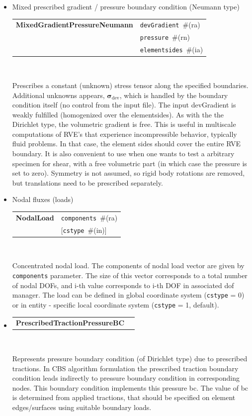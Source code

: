 \documentclass[a4paper]{article}
\makeatletter
\newcommand{\tens}[1]{\boldsymbol{#1}} %
\newcommand{\dev}{\mathrm{dev}}
\newcommand{\param}[1]{\texttt{#1}} %
\newcommand{\optional}[1]{[#1]} %
\newcommand{\field}[2]{\param{#1}~\#{\tiny(#2)}} %
\newcommand{\optField}[2]{\optional{\field{#1}{#2}}}
\newcommand{\entKeywordInst}[1]{\textbf{#1}} %
\newenvironment{record}[1][]{\begin{tabular}{|ll}}{\end{tabular}\\}
\newcommand{\recentry}[2]{{#1}&{#2}\\}
\newcounter{rcc}
\newenvironment{record}[1][\textwidth]{\setcounter{rcc}{0}\begin{tabular*}{#1}{|ll@{\extracolsep{\fill}}r}}{\end{tabular*}\\}
\newcommand{\recentry}[2]{\ifthenelse{\value{rcc}>0}{&$\backslash$ \\}{\setcounter{rcc}{1}}{#1}&{#2}}
\makeatother
\begin{document}
\begin{itemize}
\item Mixed prescribed gradient / pressure boundary condition (Neumann type)

\begin{record}[0.9\textwidth]
  \recentry{\entKeywordInst{MixedGradientPressureNeumann}}{\field{devGradient}{ra}}
  \recentry{}{\field{pressure}{rn}}
  \recentry{}{\field{elementsides}{ia}}
\end{record}

Prescribes a constant (unknown) stress tensor along the specified boundaries.
Additional unknowns appears, $\tens{\sigma}_\dev$, which is handled by the boundary condition itself (no control from the input file).
The input devGradient is weakly fulfilled (homogenized over the elementsides). As with the the Dirichlet type, the volumetric gradient is free.
This is useful in multiscale computations of RVE's that experience incompressible behavior, typically fluid problems. In that case, the element sides should cover the entire RVE boundary.
It is also convenient to use when one wants to test a arbitrary specimen for shear, with a free volumetric part (in which case the pressure is set to zero).
Symmetry is not assumed, so rigid body rotations are removed, but translations need to be prescribed separately.

\item Nodal fluxes (loads)

\noindent
\begin{record}[0.9\textwidth]
  \recentry{\entKeywordInst{NodalLoad}}{\field{components}{ra}} \recentry{}{\optField{cstype}{in}}
\end{record}

Concentrated nodal load. The components of nodal load vector
are given by \param{components} parameter. The size of this vector
corresponds to a total number of nodal DOFs, and i-th value
corresponds to i-th DOF in associated dof manager. The load can be defined in global coordinate system (\param{cstype} =
0) or in entity - specific local coordinate system
(\param{cstype} = 1, default).
\item \mbox{}

\noindent
\begin{record}[0.9\textwidth]
  \recentry{\entKeywordInst{PrescribedTractionPressureBC}}{}
\end{record}

Represents pressure boundary condition (of Dirichlet type) due to
prescribed tractions.
In CBS algorithm formulation the prescribed traction
boundary condition leads indirectly to pressure boundary condition in
corresponding nodes. This boundary condition implements this pressure
bc. The value of bc is determined from applied tractions, that  should be specified on element edges/surfaces using
suitable boundary loads.

\end{itemize}
\end{document}
